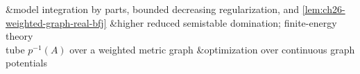  &model integration by parts, bounded decreasing regularization,
  and \cref{lem:ch26-weighted-graph-real-bfj}
 &higher reduced semistable domination; finite-energy theory\\

tube \(p^{-1}(A)\) over a weighted metric graph
 &optimization over continuous graph potentials
